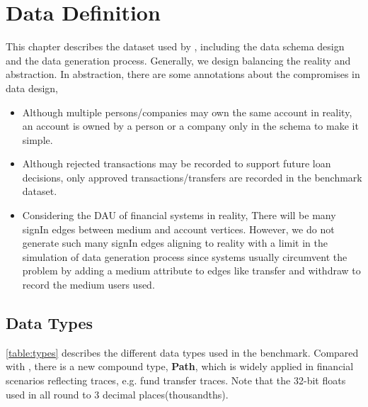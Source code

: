 \chapter{Data Definition}
\label{sec:data-definition}

This chapter describes the dataset used by \ldbcfinbench, including the data schema design
and the data generation process. Generally, we design \ldbcfinbench balancing the reality
and abstraction. In abstraction, there are some annotations about the compromises in data
design,
\begin{itemize}
    \item Although multiple persons/companies may own the same account in reality, an account
    is owned by a person or a company only in the schema to make it simple.
    \item Although rejected transactions may be recorded to support future loan decisions,
    only approved transactions/transfers are recorded in the benchmark dataset.
    \item Considering the DAU of financial systems in reality, There will be many signIn edges
    between medium and account vertices. However, we do not generate such many signIn edges aligning
    to reality with a limit in the simulation of data generation process since systems usually 
    circumvent the problem by adding a medium attribute to edges like transfer and withdraw to
    record the medium users used.
\end{itemize}

\section{Data Types}

\autoref{table:types} describes the different data types used in the benchmark. Compared
with \ldbcsnb, there is a new compound type, \textbf{Path}, which is widely applied in
financial scenarios reflecting traces, e.g. fund transfer traces. Note that the 32-bit
floats used in \ldbcfinbench all round to 3 decimal places(thousandths).

